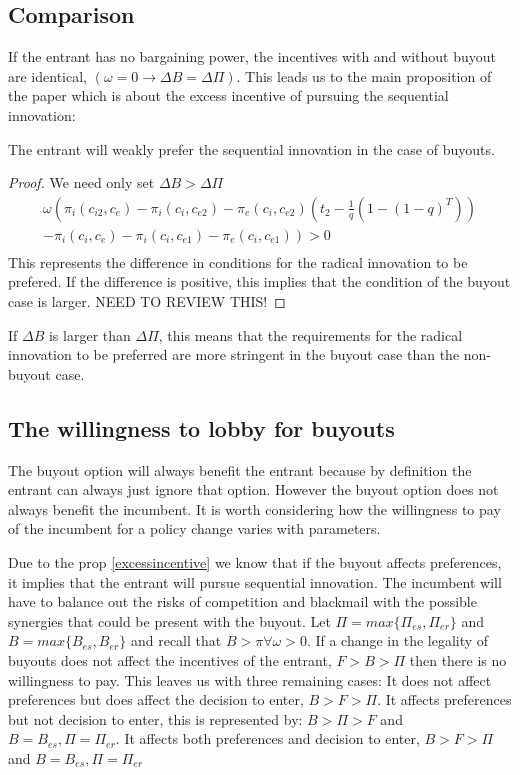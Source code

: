 \subsection{Comparison}

If the entrant has no bargaining power, the incentives with and without buyout are identical, $(\omega=0 \rightarrow \Delta B = \Delta \Pi)$. This leads us to the main proposition of the paper which is about the excess incentive of pursuing the sequential innovation:  

\begin{proposition} \label{excessincentive}
The entrant will weakly prefer the sequential innovation in the case of buyouts.
\end{proposition}
\begin{proof}
We need only set $\Delta B > \Delta \Pi $
\begin{align*}
\omega \left(  \pi_{i}(c_{i2},c_{e})- \pi_{i}(c_{i},c_{e2})-\pi_{e}(c_{i},c_{e2})  \left( t_2- \frac{1}{q} \left( 1-(1-q)^{T} \right) \right) \right. \\
-\left.\pi_i(c_i,c_{e})-\pi_i(c_i,c_{e1})-\pi_e(c_i,c_{e1}) \right)  >0 \\
\end{align*}
This represents the difference in conditions for the radical innovation to be prefered. If the difference is positive, this implies that the condition of the buyout case is larger. NEED TO REVIEW THIS! 
\end{proof}


If $\Delta B$ is larger than $\Delta \Pi$, this means that the requirements for the radical innovation to be preferred are more stringent in the buyout case than the non-buyout case.  

\subsection{The willingness to lobby for buyouts}

The buyout option will always benefit the entrant because by definition the entrant can always just ignore that option. However the buyout option does not always benefit the incumbent. It is worth considering how the willingness to pay of the incumbent for a policy change varies with parameters.

Due to the prop \ref{excessincentive} we know that if the buyout affects preferences, it implies that the entrant will pursue sequential innovation. The incumbent will have to balance out the risks of competition and blackmail with the possible synergies that could be present with the buyout. Let $\Pi = max\{ \Pi_{es},\Pi_{er} \}$ and $B = max\{ B_{es},B_{er} \}$ and recall that $B> \pi \forall \omega > 0$. If a change in the legality of buyouts does not affect the incentives of the entrant, $F>B>\Pi$ then there is no willingness to pay. This leaves us with three remaining cases: It does not affect preferences but does affect the decision to enter, $B>F> \Pi$. It affects preferences but not decision to enter, this is represented by: $B> \Pi >F$ and $B=B_{es},\Pi=\Pi_{er}$. It affects both preferences and decision to enter, $B> F>\Pi$ and $B=B_{es},\Pi=\Pi_{er}$  \newline


